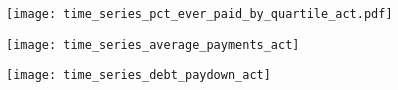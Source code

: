 \documentclass[12pt,titlepage]{article}
\begin{document}
\newpage
\begin{figure}[htbp]
\caption{}\label{full_paid_quar}
\begin{center}
\texttt{[image: time\_series\_pct\_ever\_paid\_by\_quartile\_act.pdf]}
\par\end{center}
\end{figure}
\newpage
\begin{figure}[htbp]
\begin{center}
\caption{}\label{fig:repay}
\texttt{[image: time\_series\_average\_payments\_act]}
\par\end{center}
\end{figure}
\newpage
\begin{figure}[htbp]
\begin{center}
\caption{}\label{fig:drawdown}
\texttt{[image: time\_series\_debt\_paydown\_act]}
\par\end{center}
\end{figure}
\end{document}

